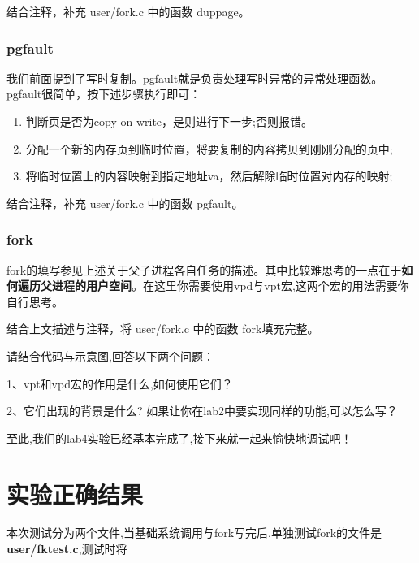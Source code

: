 \begin{exercise}
 结合注释，补充 user/fork.c 中的函数 duppage。
\end{exercise}

\subsubsection{pgfault}
我们\hyperref[页保护与处理]{前面}提到了写时复制。pgfault就是负责处理写时异常的异常处理函数。
pgfault很简单，按下述步骤执行即可：
\begin{enumerate}
	\item 判断页是否为copy-on-write，是则进行下一步;否则报错。
	\item 分配一个新的内存页到临时位置，将要复制的内容拷贝到刚刚分配的页中;
	\item 将临时位置上的内容映射到指定地址va，然后解除临时位置对内存的映射;
\end{enumerate}

\begin{exercise}
	结合注释，补充 user/fork.c 中的函数 pgfault。 
\end{exercise}

\subsubsection{fork}
fork的填写参见上述关于父子进程各自任务的描述。其中比较难思考的一点在于\textbf{如何遍历父进程的用户空间}。在这里你需要使用vpd与vpt宏,这两个宏的用法需要你自行思考。

\begin{exercise}
结合上文描述与注释，将 user/fork.c 中的函数 fork填充完整。
\end{exercise}

\begin{thinking}\label{think:vpt的使用}
	请结合代码与示意图,回答以下两个问题：
	
	1、vpt和vpd宏的作用是什么,如何使用它们？
	
	2、它们出现的背景是什么? 如果让你在lab2中要实现同样的功能,可以怎么写？
\end{thinking}

至此,我们的lab4实验已经基本完成了,接下来就一起来愉快地调试吧！

\section{实验正确结果}

本次测试分为两个文件,当基础系统调用与fork写完后,单独测试fork的文件是\textbf{user/fktest.c},测试时将

